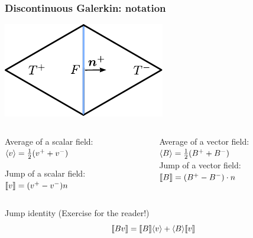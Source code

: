 \begin{frame}
  \frametitle{Discontinuous Galerkin: notation}

  \includegraphics[scale=1.0]{pdf/dg-terms-interface.pdf}

  \begin{columns}[t]
    \begin{column}{0.5\textwidth}
      \alert{Average of a scalar field}: \\ $\langle v \rangle = \tfrac{1}{2} (v^+ + v^-)$ \\
      \bigskip

      \alert{Jump of a scalar field}: \\ $\llbracket v \rrbracket = (v^+ - v^-) n$
    \end{column}
    \begin{column}{0.5\textwidth}
      \alert{Average of a vector field}: \\ $\langle B \rangle = \tfrac{1}{2} (B^+ + B^-)$ \\
      \bigskip
      \alert{Jump of a vector field}: \\ $\llbracket B \rrbracket = (B^+ - B^-) \cdot n$
    \end{column}
  \end{columns}

  \bigskip

  {\alert{Jump identity} (Exercise for the reader!)}
  \begin{equation*}
    \llbracket B v  \rrbracket = \llbracket B \rrbracket \langle v \rangle
    + \langle B \rangle \llbracket v \rrbracket
  \end{equation*}
\end{frame}

